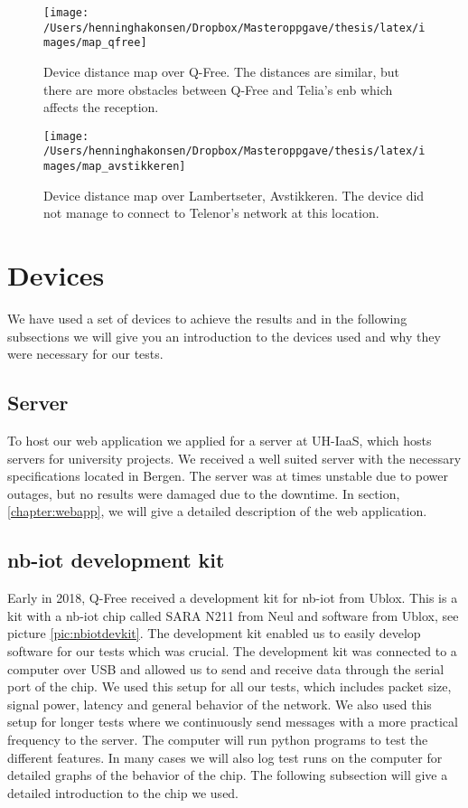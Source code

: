 \documentclass[USenglish]{ifimaster}  %
\begin{document}
\begin{figure}[H]
  \centering\texttt{[image: /Users/henninghakonsen/Dropbox/Masteroppgave/thesis/latex/images/map\_qfree]}
  \caption[Distance map - Q-Free]{Device distance map over Q-Free. The distances are similar, but there are more obstacles between Q-Free and Telia's \acrshort{enb} which affects the reception.}
  \label{figure:map_qfree}
\end{figure}

\begin{figure}[H]
  \centering\texttt{[image: /Users/henninghakonsen/Dropbox/Masteroppgave/thesis/latex/images/map\_avstikkeren]}
  \caption[Distance map - Lambertseter]{Device distance map over Lambertseter, Avstikkeren. The device did not manage to connect to Telenor's network at this location.}
  \label{figure:map_avstikkeren}
\end{figure}

\section{Devices} \label{ssection:devices}
We have used a set of devices to achieve the results and in the following subsections we will give you an introduction to the devices used and why they were necessary for our tests.

\subsection{Server}
To host our web application we applied for a server at UH-IaaS, which hosts servers for university projects. We received a well suited server with the necessary specifications located in Bergen. The server was at times unstable due to power outages, but no results were damaged due to the downtime. In section, \vref{chapter:webapp}, we will give a detailed description of the web application.

\subsection{\acrshort{nb-iot} development kit}
Early in 2018, Q-Free received a development kit for \acrshort{nb-iot} from Ublox. This is a kit with a \acrshort{nb-iot} chip called SARA N211 from Neul and software from Ublox, see picture \vref{pic:nbiotdevkit}. The development kit enabled us to easily develop software for our tests which was crucial. The development kit was connected to a computer over USB and allowed us to send and receive data through the serial port of the chip. We used this setup for all our tests, which includes packet size, signal power, latency and general behavior of the network. We also used this setup for longer tests where we continuously send messages with a more practical frequency to the server. The computer will run python programs to test the different features. In many cases we will also log test runs on the computer for detailed graphs of the behavior of the chip. The following subsection will give a detailed introduction to the chip we used.
\end{document}
